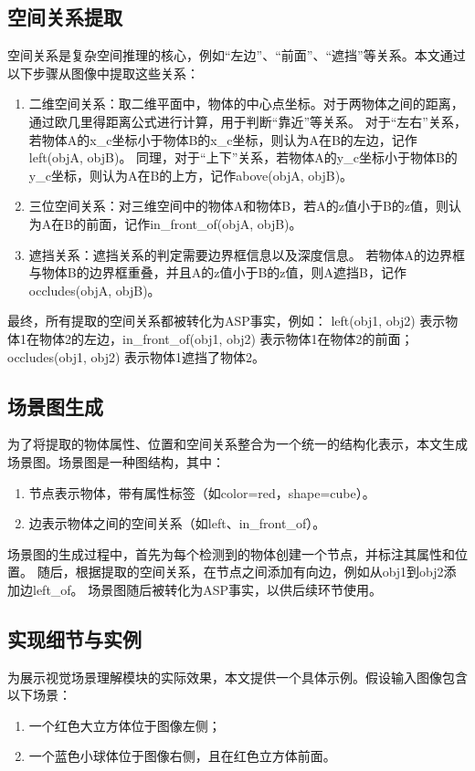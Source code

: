 \subsection{空间关系提取}
空间关系是复杂空间推理的核心，例如“左边”、“前面”、“遮挡”等关系。本文通过以下步骤从图像中提取这些关系：
\begin{enumerate}[label=(\arabic*),itemsep=0pt,parsep=0pt]
    \item 二维空间关系：取二维平面中，物体的中心点坐标。对于两物体之间的距离，通过欧几里得距离公式进行计算，用于判断“靠近”等关系。
对于“左右”关系，若物体A的x\_c坐标小于物体B的x\_c坐标，则认为A在B的左边，记作left(objA, objB)。
同理，对于“上下”关系，若物体A的y\_c坐标小于物体B的y\_c坐标，则认为A在B的上方，记作above(objA, objB)。
    \item 三位空间关系：对三维空间中的物体A和物体B，若A的z值小于B的z值，则认为A在B的前面，记作in\_front\_of(objA, objB)。
    \item 遮挡关系：遮挡关系的判定需要边界框信息以及深度信息。
若物体A的边界框与物体B的边界框重叠，并且A的z值小于B的z值，则A遮挡B，记作
occludes(objA, objB)。
\end{enumerate}

最终，所有提取的空间关系都被转化为ASP事实，例如：
left(obj1, obj2) 表示物体1在物体2的左边，in\_front\_of(obj1, obj2) 表示物体1在物体2的前面；
occludes(obj1, obj2) 表示物体1遮挡了物体2。
\subsection{场景图生成}
为了将提取的物体属性、位置和空间关系整合为一个统一的结构化表示，本文生成场景图。场景图是一种图结构，其中：
\begin{enumerate}
    \item 节点表示物体，带有属性标签（如color=red，shape=cube）。
    \item 边表示物体之间的空间关系（如left、in\_front\_of）。
\end{enumerate}

场景图的生成过程中，首先为每个检测到的物体创建一个节点，并标注其属性和位置。
随后，根据提取的空间关系，在节点之间添加有向边，例如从obj1到obj2添加边left\_of。
场景图随后被转化为ASP事实，以供后续环节使用。
\subsection{实现细节与实例}
为展示视觉场景理解模块的实际效果，本文提供一个具体示例。假设输入图像包含以下场景：
\begin{enumerate}
\item 一个红色大立方体位于图像左侧；
\item 一个蓝色小球体位于图像右侧，且在红色立方体前面。
\end{enumerate}

